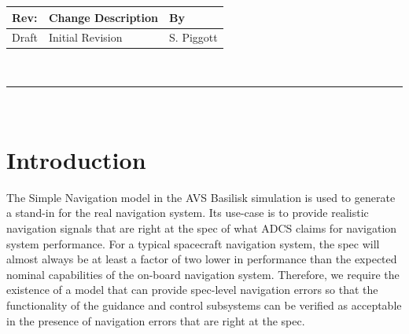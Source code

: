\documentclass[]{BasiliskReportMemo}
\begin{document}
\makeCover


%
%
\pagestyle{empty}
{\renewcommand{\arraystretch}{2}
\noindent
\begin{longtable}{|p{0.5in}|p{4.5in}|p{1.14in}|}
\hline
{\bfseries Rev}: & {\bfseries Change Description} & {\bfseries By} \\
\hline
Draft & Initial Revision & S. Piggott \\
\hline

\end{longtable}
}

\newpage
\setcounter{page}{1}
\pagestyle{fancy}

\tableofcontents
~\\ \hrule ~\\


\section{Introduction}
The Simple Navigation model in the AVS Basilisk simulation is used to generate 
a stand-in for the real navigation system.  Its use-case is to provide realistic 
navigation signals that are right at the spec of what ADCS claims for navigation 
system performance.  For a typical spacecraft navigation system, the spec will 
almost always be at least a factor of two lower in performance than the expected 
nominal capabilities of the on-board navigation system.  Therefore, we require 
the existence of a model that can provide spec-level navigation errors so that 
the functionality of the guidance and control subsystems can be verified as 
acceptable in the presence of navigation errors that are right at the spec. \\
\end{document}
